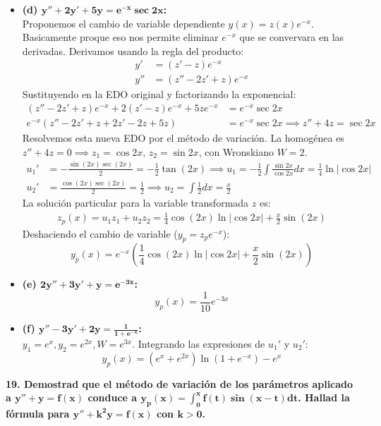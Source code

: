 \documentclass[11pt, a4paper]{article}
\begin{document}
\begin{itemize}
\item \textbf{(d) $\bm{y''+2y'+5y=e^{-x}\sec 2x}$:} \\
Proponemos el cambio de variable dependiente $y(x) = z(x)e^{-x}$. Basicamente proque eso nos permite eliminar $e^{-x}$ que se convervara en las derivadas. Derivamos usando la regla del producto:
\begin{align*}
y' &= (z' - z)e^{-x} \\
y'' &= (z'' - 2z' + z)e^{-x}
\end{align*}
Sustituyendo en la EDO original y factorizando la exponencial:
\begin{align*}
(z'' - 2z' + z)e^{-x} + 2(z' - z)e^{-x} + 5z e^{-x} &= e^{-x}\sec 2x \\
e^{-x}(z'' - 2z' + z + 2z' - 2z + 5z) &= e^{-x}\sec 2x \implies z'' + 4z = \sec 2x
\end{align*}
Resolvemos esta nueva EDO por el método de variación. La homogénea es $z''+4z=0 \implies z_1 = \cos 2x, \, z_2 = \sin 2x$, con Wronskiano $W = 2$.
\begin{align*}
u_1' &= -\frac{\sin(2x)\sec(2x)}{2} = -\frac{1}{2}\tan(2x) \implies u_1 = -\frac{1}{2}\int \frac{\sin 2x}{\cos 2x}dx = \frac{1}{4}\ln|\cos 2x| \\
u_2' &= \frac{\cos(2x)\sec(2x)}{2} = \frac{1}{2} \implies u_2 = \int \frac{1}{2}dx = \frac{x}{2}
\end{align*}
La solución particular para la variable transformada $z$ es: 
\begin{align*}
z_p(x) = u_1 z_1 + u_2 z_2 = \frac{1}{4}\cos(2x)\ln|\cos 2x| + \frac{x}{2}\sin(2x)
\end{align*}
Deshaciendo el cambio de variable ($y_p = z_p e^{-x}$):
\[
\boxed{y_p(x) = e^{-x}\left(\frac{1}{4}\cos(2x)\ln|\cos 2x| + \frac{x}{2}\sin(2x)\right)}
\]
\item \textbf{(e) $\bm{2y''+3y'+y=e^{-3x}}$:}
\[
\boxed{y_p(x) = \frac{1}{10}e^{-3x}}
\]

\item \textbf{(f) $\bm{y''-3y'+2y=\frac{1}{1+e^{-x}}}$:} \\
$y_1 = e^x, y_2 = e^{2x}, W = e^{3x}$. Integrando las expresiones de $u_1'$ y $u_2'$:
\[
\boxed{y_p(x) = (e^x + e^{2x})\ln(1+e^{-x}) - e^x}
\]
\end{itemize}

\noindent\textbf{19. Demostrad que el método de variación de los parámetros aplicado a $\bm{y''+y=f(x)}$ conduce a $\bm{y_p(x)=\int_0^x f(t)\sin(x-t)dt}$. Hallad la fórmula para $\bm{y''+k^2y=f(x)}$ con $\bm{k>0}$.}
\end{document}

